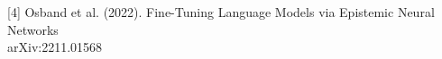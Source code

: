 \documentclass[preview]{standalone}
\begin{document}
\begin{center}
[4] Osband et al. (2022). Fine-Tuning Language Models via Epistemic Neural Networks\\arXiv:2211.01568
\end{center}
\end{document}

